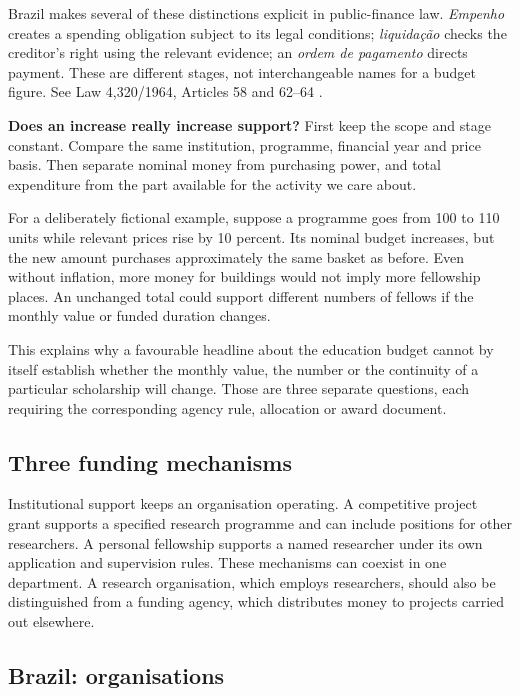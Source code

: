 Brazil makes several of these distinctions
explicit
in public-finance law. \emph{Empenho} creates
a spending
obligation subject to its legal conditions;
\emph{liquidação} checks the creditor's right
using the
relevant evidence; an \emph{ordem de
pagamento}
directs payment. These are different stages,
not interchangeable names for a budget
figure.
See Law 4,320/1964, Articles 58 and 62--64
\cite{gsf-br-budget-law}.

\textbf{Does an increase really increase
support?}
First keep the scope and stage constant.
Compare the same institution, programme,
financial year
and price basis. Then separate nominal money
from
purchasing power, and total expenditure from
the part
available for the activity we care about.

For a deliberately fictional example, suppose
a
programme goes from 100 to 110 units while
relevant
prices rise by 10 percent. Its nominal budget
increases,
but the new amount purchases approximately
the same
basket as before. Even without inflation,
more money
for buildings would not imply more fellowship
places.
An unchanged total could support different
numbers of
fellows if the monthly value or funded
duration changes.

This explains why a favourable headline about
the education budget cannot by itself
establish whether the monthly value, the
number or the continuity of a particular
scholarship will change.
Those are three separate questions, each
requiring the
corresponding agency rule, allocation or
award document.

\subsection{Three funding mechanisms}
\label{subsection-gsf-mechanisms}

Institutional support keeps an organisation
operating. A competitive project grant
supports a specified research programme and
can include positions for other researchers.
A personal fellowship supports a named
researcher under its own application and
supervision rules. These mechanisms can
coexist in one department. A research
organisation, which employs researchers,
should also be distinguished from a funding
agency, which distributes money to projects
carried out elsewhere.

\subsection{Brazil: organisations}
\label{section-gsf-brazil-map}

